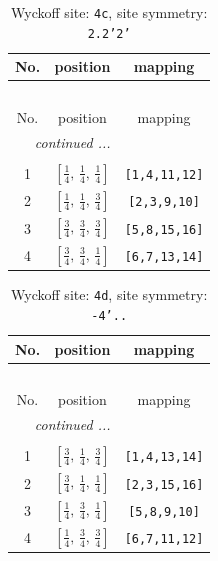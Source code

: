 \documentclass[fleqn,8pt]{jsarticle}
\begin{document}
\renewcommand{\arraystretch}{1.2}
\begin{longtable}{ccc}
\caption{Wyckoff site: {\tt 4c}, site symmetry: {\tt 2.2'2'}}
 \\
 \hline \hline
No. & position & mapping \\ \hline \endfirsthead

\multicolumn{2}{l}{\tablename\ \thetable{}} \\
 \hline \hline
No. & position & mapping \\ \hline \endhead

 \hline \hline
\multicolumn{2}{r}{\footnotesize\it continued ...} \\ \endfoot

 \hline \hline
\multicolumn{2}{r}{} \\ \endlastfoot

1 & $\left[ \frac{1}{4},\, \frac{1}{4},\, \frac{1}{4} \right]$ & {\tt [1,4,11,12]} \\ \hline
2 & $\left[ \frac{1}{4},\, \frac{1}{4},\, \frac{3}{4} \right]$ & {\tt [2,3,9,10]} \\ \hline
3 & $\left[ \frac{3}{4},\, \frac{3}{4},\, \frac{3}{4} \right]$ & {\tt [5,8,15,16]} \\ \hline
4 & $\left[ \frac{3}{4},\, \frac{3}{4},\, \frac{1}{4} \right]$ & {\tt [6,7,13,14]} \\
\end{longtable}
\renewcommand{\arraystretch}{1.2}
\begin{longtable}{ccc}
\caption{Wyckoff site: {\tt 4d}, site symmetry: {\tt -4'..}}
 \\
 \hline \hline
No. & position & mapping \\ \hline \endfirsthead

\multicolumn{2}{l}{\tablename\ \thetable{}} \\
 \hline \hline
No. & position & mapping \\ \hline \endhead

 \hline \hline
\multicolumn{2}{r}{\footnotesize\it continued ...} \\ \endfoot

 \hline \hline
\multicolumn{2}{r}{} \\ \endlastfoot

1 & $\left[ \frac{3}{4},\, \frac{1}{4},\, \frac{3}{4} \right]$ & {\tt [1,4,13,14]} \\ \hline
2 & $\left[ \frac{3}{4},\, \frac{1}{4},\, \frac{1}{4} \right]$ & {\tt [2,3,15,16]} \\ \hline
3 & $\left[ \frac{1}{4},\, \frac{3}{4},\, \frac{1}{4} \right]$ & {\tt [5,8,9,10]} \\ \hline
4 & $\left[ \frac{1}{4},\, \frac{3}{4},\, \frac{3}{4} \right]$ & {\tt [6,7,11,12]} \\
\end{longtable}
\end{document}
